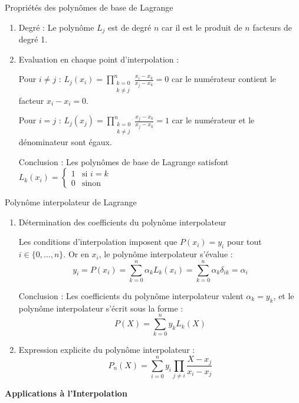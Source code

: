 \documentclass[10pt,a4paper]{article}
\begin{document}
\q Propriétés des polynômes de base de Lagrange
\begin{enumerate}
    \item Degré : Le polynôme \( L_j \) est de degré \( n \) car il est le produit de \( n \)
    facteurs de degré 1.

    \item Evaluation en chaque point d'interpolation :

    Pour \( i \neq j \) :
    \(
    L_j(x_i) = \prod_{\substack{k=0 \\ k\neq j}}^{n} \frac{x_i - x_k}{x_j - x_k} = 0
    \)
    car le numérateur contient le facteur \( x_i - x_i = 0 \).

    Pour \( i = j \) :
    \(
    L_j(x_j) = \prod_{\substack{k=0 \\ k\neq j}}^{n} \frac{x_j - x_k}{x_j - x_k} = 1
    \)
    car le numérateur et le dénominateur sont égaux.

    Conclusion : Les polynômes de base de Lagrange satisfont
    \(
    L_k(x_i) =
    \begin{cases}
        1 & \text{si } i = k \\
        0 & \text{sinon}
    \end{cases}
    \)
\end{enumerate}

\q Polynôme interpolateur de Lagrange
\begin{enumerate}
    \item Détermination des coefficients du polynôme interpolateur

    Les conditions d'interpolation imposent que $P(x_i) = y_i$ pour tout $i \in \{0, ..., n\}$.
    Or en $x_i$, le polynôme interpolateur s'évalue :
    $$y_i = P(x_i) = \sum_{k=0}^n \alpha_k L_k(x_i) = \sum_{k=0}^n \alpha_k \delta_{ik} = \alpha_i$$

    Conclusion : Les coefficients du polynôme interpolateur valent $\alpha_k = y_k$, et le polynôme
    interpolateur s'écrit sous la forme :
    \[
    P(X) = \sum_{k=0}^{n} y_k L_k(X)
    \]

    \item Expression explicite du polynôme interpolateur :
    \[
    P_n(X) = \sum_{i=0}^n y_i \prod_{j \neq i} \frac{X - x_j}{x_i - x_j}
    \]
\end{enumerate}

\bigskip
\textbf{Applications à l'Interpolation}
\end{document}
